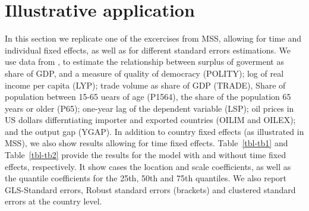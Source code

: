 \documentclass[
  authoryear,
  review,
  1p]{elsarticle}
\begin{document}
\section{Illustrative application}\label{illustrative-application}

In this section we replicate one of the excercises from MSS, allowing
for time and individual fixed effects, as well as for different standard
errors estimations. We use data from \citet{persson_economic_2005}, to
estimate the relationship between surplus of goverment as share of GDP,
and a measure of quality of democracy (POLITY); log of real income per
capita (LYP); trade volume as share of GDP (TRADE), Share of population
between 15-65 uears of age (P1564), the share of the population 65 years
or older (P65); one-year lag of the dependent variable (LSP); oil prices
in US dollars differntiating importer and exported countries (OILIM and
OILEX); and the output gap (YGAP). In addition to country fixed effects
(as illustrated in MSS), we also show results allowing for time fixed
effects. Table~\ref{tbl-tb1} and Table~\ref{tbl-tb2} provide the results
for the model with and without time fixed effects, respectively. It show
cases the location and scale coefficients, as well as the quantile
coefficients for the 25th, 50th and 75th quantiles. We also report
GLS-Standard errors, Robust standard errors (brackets) and clustered
standard errors at the country level.
\end{document}
